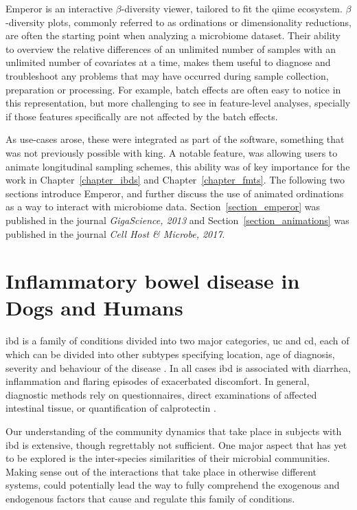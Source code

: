 \documentclass[12pt,chapterheads]{ucsd}
\begin{document}
Emperor is an interactive $\beta$-diversity viewer, tailored to fit the 
\gls{qiime} ecosystem. $\beta$-diversity plots, commonly referred to as 
ordinations or dimensionality reductions, are often the starting point when 
analyzing a microbiome dataset. Their ability to overview the relative 
differences of an unlimited number of samples with an unlimited number of 
covariates at a time, makes them useful to diagnose and troubleshoot any 
problems that may have occurred during sample collection, preparation or 
processing. For example, batch effects are often easy to notice in this 
representation\cite{Gibbons165910}, but more challenging to see in 
feature-level analyses, specially if those features specifically are not 
affected by the batch effects.

As use-cases arose, these were integrated as part of the software, something 
that was not previously possible with \gls{king}. A notable feature, was 
allowing users to animate longitudinal sampling schemes, this ability was of 
key importance for the work in Chapter~\ref{chapter_ibds} and 
Chapter~\ref{chapter_fmts}. The following two sections introduce Emperor, and 
further discuss the use of animated ordinations as a way to interact with 
microbiome data. Section~\ref{section_emperor} was published in the journal 
\textsl{GigaScience, 2013} and Section~\ref{section_animations} was published 
in the journal \textsl{Cell Host \& Microbe, 2017}.




\chapter{Inflammatory bowel disease in Dogs and Humans}

\gls{ibd} is a family of conditions divided into two major categories, \gls{uc} 
and \gls{cd}, each of which can be divided into other subtypes specifying 
location, age of diagnosis, severity and behaviour of the disease 
\cite{RN4265}.  In all cases \gls{ibd} is associated with diarrhea, 
inflammation and flaring episodes of exacerbated discomfort. In general, 
diagnostic methods rely on questionnaires, direct examinations of affected 
intestinal tissue, or quantification of calprotectin \cite{Sipponen2008}.

Our understanding of the community dynamics that take place in subjects with 
\gls{ibd} is extensive, though regrettably not sufficient. One major aspect 
that has yet to be explored is the inter-species similarities of their 
microbial communities. Making sense out of the interactions that take place in 
otherwise different systems, could potentially lead the way to fully comprehend 
the exogenous and endogenous factors that cause and regulate this family of 
conditions.
\end{document}
